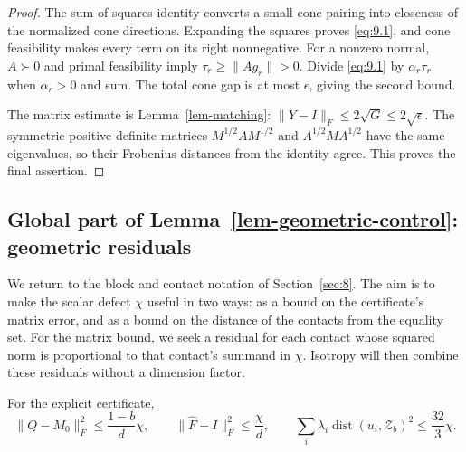 \begin{proof}
The sum-of-squares identity converts a small cone pairing into
closeness of the normalized cone directions. Expanding the squares proves
\eqref{eq:9.1}, and cone feasibility makes every term on its right nonnegative.
For a nonzero normal, $A\succ0$ and primal feasibility imply
$\tau_r\ge\|Ag_r\|>0$. Divide \eqref{eq:9.1} by $\alpha_r\tau_r$ when $\alpha_r>0$
and sum. The total cone gap is at most $\epsilon$, giving the second bound.

The matrix estimate is Lemma~\ref{lem-matching}:
$\|Y-I\|_F\le2\sqrt G\le2\sqrt\epsilon$.
The symmetric positive-definite matrices $M^{1/2}AM^{1/2}$ and
$A^{1/2}MA^{1/2}$ have the same eigenvalues, so their Frobenius distances
from the identity agree. This proves the final assertion. 
\end{proof}

\subsection{Global part of Lemma~\ref{lem-geometric-control}: geometric residuals}\label{sec:9.2}

We return to the block and contact notation of Section~\ref{sec:8}. The aim is to make
the scalar defect $\chi$ useful in two ways: as a bound on the certificate's
matrix error, and as a bound on the distance of the contacts from the equality
set. For the matrix bound, we seek a residual for each contact whose squared
norm is proportional to that contact's summand in $\chi$. Isotropy will then
combine these residuals without a dimension factor.

\begin{lemma}\label{lem-residual}
For the explicit certificate,
\begin{equation}\label{eq:9.3}
\|Q-M_0\|_F^2\le\frac{1-b}{d}\chi,\qquad
\|\widehat F-I\|_F^2\le\frac\chi d,
\qquad
\sum_i\lambda_i\operatorname{dist}(u_i,\mathcal Z_b)^2
\le\frac{32}{3}\chi.
\end{equation}

\end{lemma}

